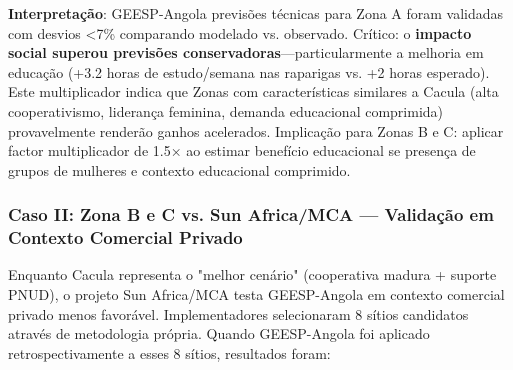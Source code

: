 \documentclass[12pt, a4paper]{article}
\begin{document}
\begin{table}[H]
\centering
\caption{Validação de Predições GEESP em Cacula: Comparação Modelado vs. Observado}
\label{tab:cacula_validation}
\footnotesize
{}
\end{table}
\textbf{Interpretação}: GEESP-Angola previsões técnicas para Zona A foram validadas com desvios <7\% comparando modelado vs. observado. Crítico: o
\textbf{impacto social superou previsões conservadoras}---particularmente a melhoria em educação (+3.2 horas de estudo/semana nas raparigas vs. +2 horas esperado). Este multiplicador indica que Zonas com características similares a Cacula (alta cooperativismo, liderança feminina, demanda educacional comprimida) provavelmente renderão ganhos acelerados. Implicação para Zonas B e C: aplicar factor multiplicador de 1.5× ao estimar benefício educacional se presença de grupos de mulheres e contexto educacional comprimido.

\subsubsection*{Caso II: Zona B e C vs. Sun Africa/MCA — Validação em Contexto Comercial Privado}

Enquanto Cacula representa o "melhor cenário" (cooperativa madura + suporte PNUD), o projeto Sun Africa/MCA testa GEESP-Angola em contexto comercial privado menos favorável. Implementadores selecionaram 8 sítios candidatos através de metodologia própria. Quando GEESP-Angola foi aplicado retrospectivamente a esses 8 sítios, resultados foram:
\end{document}
